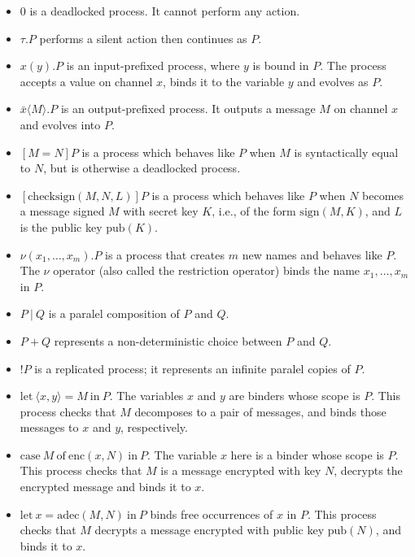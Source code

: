 \documentclass{article}
\begin{document}
\begin{itemize}
\item $0$ is a deadlocked process. It cannot perform any action.
\item $\tau.P$ performs a silent action then continues as $P$.
\item $x(y).P$ is an input-prefixed process, where $y$ is bound in $P$.
The process accepts a value on channel $x$, binds it to the
variable $y$ and evolves as $P$.
\item $\bar x\langle M \rangle.P$ is an output-prefixed process. It outputs a message $M$ on channel $x$
and evolves into $P$.
\item $[M = N] P$ is a process which behaves like $P$ when $M$ is syntactically equal to $N$,
but is otherwise a deadlocked process.
\item $[\mathrm{checksign}(M, N, L)] P$ is a process which behaves like $P$ when $N$ becomes a message signed $M$
with secret key $K$, i.e., of the form $\mathrm{sign}(M, K)$, and $L$ is the public key $\mathrm{pub}(K)$.
\item $\nu (x_1,\ldots,x_m). P$ is a process that creates $m$ new names and behaves like $P$. 
The $\nu$ operator (also called the restriction operator) binds the name $x_1,\ldots, x_m$ in $P$. 
\item $P ~|~ Q$ is a paralel composition of $P$ and $Q$.
\item $P + Q$ represents a non-deterministic choice between $P$ and $Q$.
\item $!P$ is a replicated process; it represents an infinite paralel copies of $P$. 
\item $\mathrm{let}~ \langle x, y \rangle = M ~ \mathrm{ in } ~ P.$ The variables $x$ and $y$
are binders whose scope is $P$. This process checks that $M$ decomposes to a pair of messages,
and binds those messages to $x$ and $y$, respectively. 
\item $\mathrm{case} ~ M ~ \mathrm{ of } ~ \mathrm{enc}(x,N) ~ \mathrm{ in } ~ P.$
The variable $x$ here is a binder whose scope is $P$. 
This process checks that $M$ is a message encrypted with key $N$, decrypts the
encrypted message and binds it to $x.$
\item $\mathrm{let} ~ x = \mathrm{adec}(M,N) ~ \mathrm{ in } ~ P$ 
binds free occurrences of $x$ in $P$. 
This process checks that $M$ decrypts a message encrypted with public key $\mathrm{pub}(N)$, and binds it to $x$.
\end{itemize}
\end{document}
